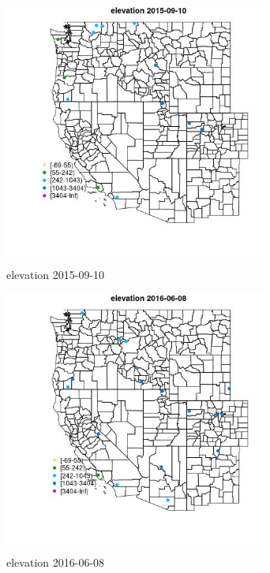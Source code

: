 \begin{figure} 
\centering  
\includegraphics[width=0.77\textwidth]{Code_Outputs/Report_ML_input_PM25_Step4_part_e_de_duplicated_aves_MapObselevation2015-09-10.jpg} 
\caption{\label{fig:Report_ML_input_PM25_Step4_part_e_de_duplicated_avesMapObselevation2015-09-10}elevation 2015-09-10} 
\end{figure} 
 

\begin{figure} 
\centering  
\includegraphics[width=0.77\textwidth]{Code_Outputs/Report_ML_input_PM25_Step4_part_e_de_duplicated_aves_MapObselevation2016-06-08.jpg} 
\caption{\label{fig:Report_ML_input_PM25_Step4_part_e_de_duplicated_avesMapObselevation2016-06-08}elevation 2016-06-08} 
\end{figure} 
 

